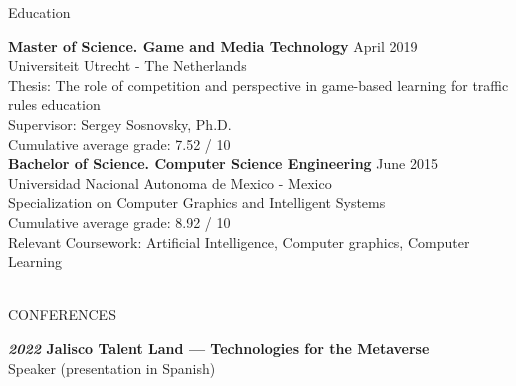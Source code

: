\documentclass{resume} %
\begin{document}

\newpage
\begin{rSection}{Education}

{\bf Master of Science. Game and Media Technology} \hfill {April 2019}\\
Universiteit Utrecht - The Netherlands\\
Thesis: The role of competition and perspective in game-based learning for traffic rules education \\
Supervisor: Sergey Sosnovsky, Ph.D. \\
Cumulative average grade: 7.52 / 10\\

{\bf Bachelor of Science. Computer Science Engineering} \hfill {June 2015} \\
Universidad Nacional Autonoma de Mexico - Mexico\\
Specialization on Computer Graphics and Intelligent Systems \\
Cumulative average grade: 8.92 / 10 \\
Relevant Coursework: Artificial Intelligence, Computer graphics, Computer Learning \\
\\
\end{rSection}

\begin{rSection}{CONFERENCES}
\vspace{-1.25em}
\item \textbf{\textit{2022} Jalisco Talent Land — Technologies for the Metaverse} \\ {Speaker (presentation in Spanish)}
\end{rSection} 
\end{document}
